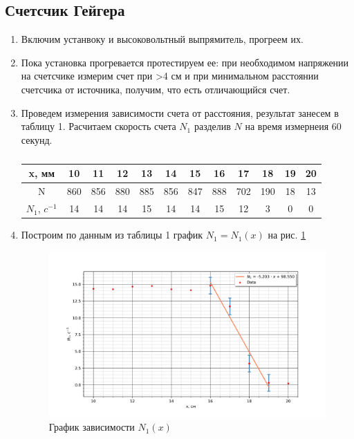 \documentclass[a4paper]{article}
\begin{document}
\subsection{Счетсчик Гейгера}

\begin{enumerate}
    \item Включим устанвоку и высоковольтный выпрямитель, прогреем их. 
    

    \item Пока установка прогревается протестируем ее: при необходимом напряжении на счетсчике измерим
    счет при >4 см и при минимальном расстоянии счетсчика от источника, получим, что есть отличающийся счет.


    \item Проведем измерения зависимости счета от расстояния, результат занесем в таблицу 1. Расчитаем скорость счета $N_1$ разделив $N$
    на время измернеия 60 секунд.
    
    \begin{table}[h]
        \centering
        \caption{}
        \label{t1}
        \begin{tabular}{|c||c|c|c|c|c|c|c|c|c|c|c|}
            \hline
            x, мм&10&11&12&13&14&15&16&17&18&19&20 \\ \hline
            N&860&856&880&885&856&847&888&702&190&18&13 \\ \hline
            $N_1$, $c^{-1}$&14&14&14&15&14&14&15&12&3&0&0 \\ \hline
   
        \end{tabular}
    \end{table}


    \item Построим по данным из таблицы 1 график $N_1 = N_1(x)$ на рис. \ref{gr1}

    \begin{figure}[H]
        \begin{center}
        \includegraphics[scale = 0.8]{gr1.png}
        \caption{График зависимости $N_1(x)$}
        \label{gr1}
        \end{center}
    \end{figure}



\end{enumerate}
\end{document}
